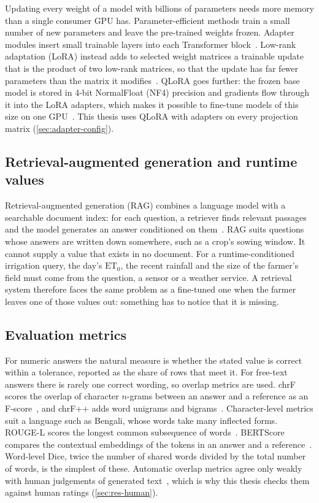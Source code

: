 Updating every weight of a model with billions of parameters needs more memory than a single consumer GPU has. Parameter-efficient methods train a small number of new parameters and leave the pre-trained weights frozen. Adapter modules insert small trainable layers into each Transformer block~\cite{houlsby2019parameter}. Low-rank adaptation (LoRA) instead adds to selected weight matrices a trainable update that is the product of two low-rank matrices, so that the update has far fewer parameters than the matrix it modifies~\cite{hu2022lora}. QLoRA goes further: the frozen base model is stored in 4-bit NormalFloat (NF4) precision and gradients flow through it into the LoRA adapters, which makes it possible to fine-tune models of this size on one GPU~\cite{dettmers2023qlora}. This thesis uses QLoRA with adapters on every projection matrix (\cref{sec:adapter-config}).

\subsection{Retrieval-augmented generation and runtime values}
\label{sec:prelim-rag}

Retrieval-augmented generation (RAG) combines a language model with a searchable document index: for each question, a retriever finds relevant passages and the model generates an answer conditioned on them~\cite{lewis2020rag}. RAG suits questions whose answers are written down somewhere, such as a crop's sowing window. It cannot supply a value that exists in no document. For a runtime-conditioned irrigation query, the day's $\mathrm{ET}_0$, the recent rainfall and the size of the farmer's field must come from the question, a sensor or a weather service. A retrieval system therefore faces the same problem as a fine-tuned one when the farmer leaves one of those values out: something has to notice that it is missing.

\subsection{Evaluation metrics}
\label{sec:prelim-metrics}

For numeric answers the natural measure is whether the stated value is correct within a tolerance, reported as the share of rows that meet it. For free-text answers there is rarely one correct wording, so overlap metrics are used. chrF scores the overlap of character $n$-grams between an answer and a reference as an F-score~\cite{popovic2015chrf}, and chrF++ adds word unigrams and bigrams~\cite{popovic2017chrfpp}. Character-level metrics suit a language such as Bengali, whose words take many inflected forms. ROUGE-L scores the longest common subsequence of words~\cite{lin2004rouge}. BERTScore compares the contextual embeddings of the tokens in an answer and a reference~\cite{zhang2020bertscore}. Word-level Dice, twice the number of shared words divided by the total number of words, is the simplest of these. Automatic overlap metrics agree only weakly with human judgements of generated text~\cite{novikova2017why}, which is why this thesis checks them against human ratings (\cref{sec:res-human}).


